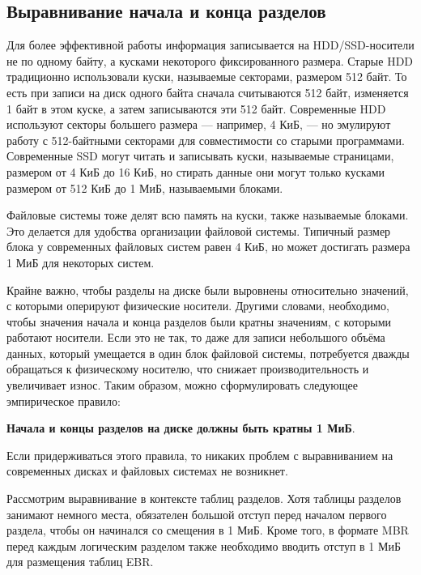 \documentclass[10pt]{article}
\begin{document}
\subsection*{Выравнивание начала и конца разделов}
Для более эффективной работы информация записывается на HDD/SSD-носители не по одному байту, а кусками некоторого фиксированного размера.
Старые HDD традиционно использовали куски, называемые секторами, размером 512 байт. То есть при записи на диск одного байта сначала считываются 512 байт, изменяется 1 байт в этом куске, а затем записываются эти 512 байт. Современные HDD используют секторы большего размера — например, 4 КиБ, — но эмулируют работу с 512-байтными секторами для совместимости со старыми программами.
Современные SSD могут читать и записывать куски, называемые страницами, размером от 4 КиБ до 16 КиБ, но стирать данные они могут только кусками размером от 512 КиБ до 1 МиБ, называемыми блоками.

Файловые системы тоже делят всю память на куски, также называемые блоками. Это делается для удобства организации файловой системы. Типичный размер блока у современных файловых систем равен 4 КиБ, но может достигать размера 1 МиБ для некоторых систем.

Крайне важно, чтобы разделы на диске были выровнены относительно значений, с которыми оперируют физические носители. Другими словами, необходимо, чтобы значения начала и конца разделов были кратны значениям, с которыми работают носители. Если это не так, то даже для записи небольшого объёма данных, который умещается в один блок файловой системы, потребуется дважды обращаться к физическому носителю, что снижает производительность и увеличивает износ.
Таким образом, можно сформулировать следующее эмпирическое правило:
\begin{center}
\noindent \textbf{Начала и концы разделов на диске должны быть кратны 1 МиБ}.
\end{center}
Если придерживаться этого правила, то никаких проблем с выравниванием на современных дисках и файловых системах не возникнет.

Рассмотрим выравнивание в контексте таблиц разделов. Хотя таблицы разделов занимают немного места, обязателен большой отступ перед началом первого раздела, чтобы он начинался со смещения в 1 МиБ. Кроме того, в формате MBR перед каждым логическим разделом также необходимо вводить отступ в 1 МиБ для размещения таблиц EBR.
\end{document}
